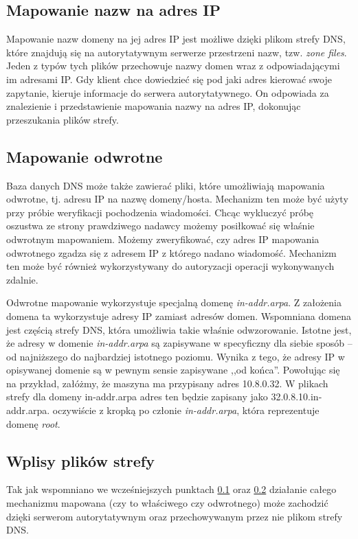 \subsection{Mapowanie nazw na adres IP}\label{mapping}
Mapowanie nazw domeny na jej adres IP jest możliwe dzięki plikom strefy DNS, które znajdują się na autorytatywnym serwerze przestrzeni nazw, tzw. \textit{zone files}. Jeden z typów tych plików przechowuje nazwy domen wraz z odpowiadającymi im adresami IP. Gdy klient chce dowiedzieć się pod jaki adres kierować swoje zapytanie, kieruje informacje do serwera autorytatywnego. On odpowiada za znalezienie i przedstawienie mapowania nazwy na adres IP, dokonując przeszukania plików strefy.

\subsection{Mapowanie odwrotne}\label{revmapping}
Baza danych DNS może także zawierać pliki, które umożliwiają mapowania odwrotne, tj. adresu IP na nazwę domeny/hosta. Mechanizm ten może być użyty przy próbie weryfikacji pochodzenia wiadomości. Chcąc wykluczyć próbę oszustwa ze strony prawdziwego nadawcy możemy posiłkować się właśnie odwrotnym mapowaniem. Możemy zweryfikować, czy adres IP mapowania odwrotnego zgadza się z adresem IP z którego nadano wiadomość. Mechanizm ten może być również wykorzystywany do autoryzacji operacji wykonywanych zdalnie. 

Odwrotne mapowanie wykorzystuje specjalną domenę \textit{in-addr.arpa}. Z założenia domena ta wykorzystuje adresy IP zamiast adresów domen.  Wspomniana domena jest częścią strefy DNS, która umożliwia takie właśnie odwzorowanie. Istotne jest, że adresy w domenie \textit{in-addr.arpa} są zapisywane w specyficzny dla siebie sposób -- od najniższego do najbardziej istotnego poziomu. Wynika z tego, że adresy IP w opisywanej domenie są w pewnym sensie zapisywane ,,od końca''. Powołując się na przykład, załóżmy, że maszyna ma przypisany adres 10.8.0.32. W plikach strefy dla domeny in-addr.arpa adres ten będzie zapisany jako 32.0.8.10.in-addr.arpa. oczywiście z kropką po członie \textit{in-addr.arpa}, która reprezentuje domenę \textit{root}.

\subsection{Wplisy plików strefy}
Tak jak wspomniano we wcześniejszych punktach \ref{mapping} oraz \ref{revmapping} działanie całego mechanizmu mapowana (czy to właściwego czy odwrotnego) może zachodzić dzięki serwerom autorytatywnym oraz przechowywanym przez nie plikom strefy DNS. 

